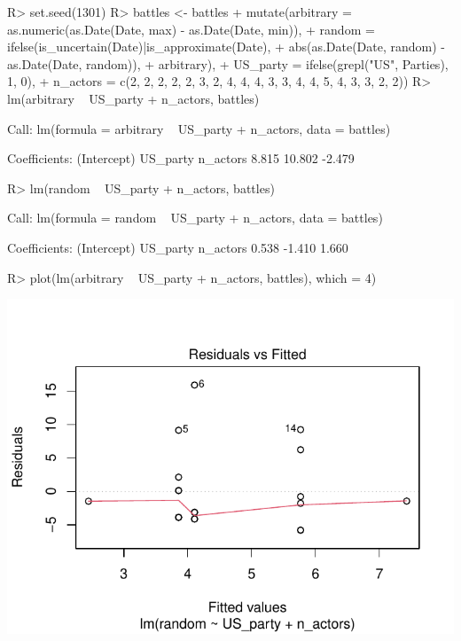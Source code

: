 \documentclass[
]{jss}
\begin{document}
\begin{CodeChunk}
\begin{CodeInput}
R> set.seed(1301)
R> battles <- battles %
+   mutate(arbitrary = as.numeric(as.Date(Date, max) - as.Date(Date, min)),
+          random = ifelse(is_uncertain(Date)|is_approximate(Date),
+                          abs(as.Date(Date, random) - as.Date(Date, random)),
+                          arbitrary),
+          US_party = ifelse(grepl("US", Parties), 1, 0),
+          n_actors = c(2, 2, 2, 2, 2, 3, 2, 4, 4, 4, 3, 3, 4, 4, 5, 4, 3, 3, 2, 2))
R> lm(arbitrary ~ US_party + n_actors, battles)
\end{CodeInput}
\begin{CodeOutput}

Call:
lm(formula = arbitrary ~ US_party + n_actors, data = battles)

Coefficients:
(Intercept)     US_party     n_actors  
      8.815       10.802       -2.479  
\end{CodeOutput}
\begin{CodeInput}
R> lm(random ~ US_party + n_actors, battles)
\end{CodeInput}
\begin{CodeOutput}

Call:
lm(formula = random ~ US_party + n_actors, data = battles)

Coefficients:
(Intercept)     US_party     n_actors  
      0.538       -1.410        1.660  
\end{CodeOutput}
\begin{CodeInput}
R> plot(lm(arbitrary ~ US_party + n_actors, battles), which = 4)
\end{CodeInput}


\begin{center}\includegraphics{article_files/figure-latex/lm-1} \end{center}

\end{CodeChunk}
\end{document}
